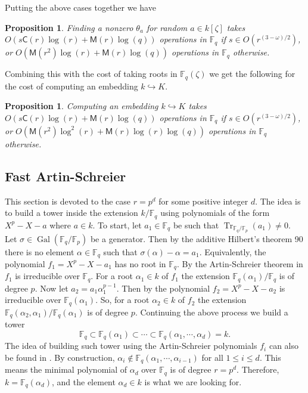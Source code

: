 \documentclass[12pt]{article}
\theoremstyle{plain}
\newtheorem{proposition}[theorem]{Proposition}
\theoremstyle{definition}
\DeclareMathOperator{\trace}{Tr} %
\DeclareMathOperator{\gal}{Gal} %
\def\F{\ensuremath{\mathbb{F}}}
\def\MM{\ensuremath{\mathsf{M}}}
\def\CC{\ensuremath{\mathsf{C}}}
\begin{document}
Putting the above cases together we have
\begin{proposition}
	\label{proposition:XiDelta-updated}
	Finding a nonzero $\theta_a$ for random $a \in k[\zeta]$ takes $O(s\CC(r)\log(r) + 
	\MM(r)\log(q))$ operations in $\F_q$ if $s \in O(r^{(3 - \omega) / 2})$, or $O(\MM(r^2)\log(r) 
	+ \MM(r)\log(q))$ operations in $\F_q$ otherwise.
\end{proposition}
Combining this with the cost of taking roots in $\F_q(\zeta)$ we get the following for the cost of 
computing an embedding $k \hookrightarrow K$.
\begin{proposition}
	\label{proposition:XiDelta-updated}
	Computing an embedding $k \hookrightarrow K$ takes $O(s\CC(r)\log(r) + \MM(r)\log(q))$ 
	operations in $\F_q$ if $s \in O(r^{(3 - \omega) / 2})$, or $O(\MM(r^2)\log^2(r) + 
	\MM(r)\log(r)\log(q))$ operations in $\F_q$ otherwise.
\end{proposition}




\subsection{Fast Artin-Schreier}
\label{sec:fast-artin-schreier}

This section is devoted to the case $r = p^d$ for some positive integer $d$. The idea is to build a 
tower inside the extension $k/\F_q$ using polynomials of the form $X^p - X - a$ where $a \in k$. To 
start, let $a_1 \in \F_q$ be such that $\trace_{\F_q/\F_p}(a_1) \ne 0$. Let $\sigma \in 
\gal(\F_q/\F_p)$ be a generator. Then by the additive Hilbert's theorem 90 there is no element 
$\alpha \in \F_q$ such that $\sigma(\alpha) - \alpha = a_1$. Equivalently, the polynomial $f_1 = 
X^p - X - a_1$ has no root in $\F_q$. By the Artin-Schreier theorem in \cite[Ch VI]{lang} $f_1$ 
is irreducible over $\F_q$. For a root $\alpha_1 \in k$ of $f_1$ the extension $\F_q(\alpha_1) / 
\F_q$ is of degree $p$.
Now let $a_2 = a_1\alpha_1^{p - 1}$. Then by \cite[Lemma 5]{Adleman-Lenstra} the polynomial $f_2 = 
X^p - X - a_2$ is irreducible over $\F_q(\alpha_1)$. So, for a root $\alpha_2 \in k$ of $f_2$ the 
extension $\F_q(\alpha_2, \alpha_1) / \F_q(\alpha_1)$ is of degree $p$. Continuing the above 
process we build a tower
\begin{equation}
	\label{equ:art-sch-tower}
	\F_q \subset \F_q(\alpha_1)  \subset \cdots \subset \F_q(\alpha_1, \cdots, \alpha_d) = k.
\end{equation}
The idea of building such tower using the Artin-Schreier polynomials $f_i$ can also be found in 
\cite{LenstraJr91, Allombert02, shoup93}. By construction, $\alpha_i \notin \F_q(\alpha_1, \cdots, 
\alpha_{i - 1})$ for all $1 \le i \le d$. This means the minimal polynomial of $\alpha_d$ over 
$\F_q$ is of degree $r = p^d$. Therefore, $k = \F_q(\alpha_d)$, and the element $\alpha_d \in k$ is 
what we are looking for.
\end{document}
